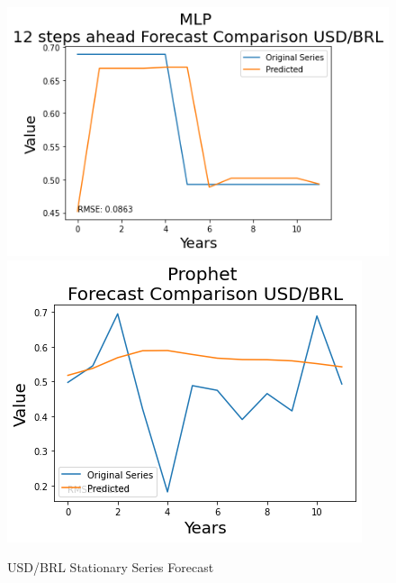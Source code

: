 \documentclass[10pt,twocolumn,letterpaper]{article}
\begin{document}
\begin{figure}[h]
		\includegraphics[width=0.45\linewidth]{../img/MLP/usd_brl_diff_for}
		\includegraphics[width=0.45\linewidth]{../img/Prophet/usd_brl_diff_for}
		\caption{USD/BRL Stationary Series Forecast}
		\label{fig:usd_brldiffforecast}
	\end{figure}
	
\end{document}
